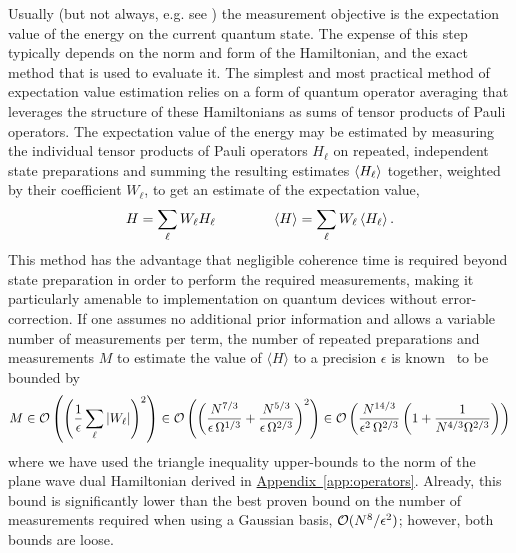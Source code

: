 \documentclass[superscriptaddress,aps,pra,nofootinbib,notitlepage,10pt,longbibliography]{revtex4-1}
\DeclareRobustCommand{\app}[1]{\hyperref[app:#1]{Appendix~\ref*{app:#1}}}
\def\avg#1{\mathinner{\langle{#1}\rangle}}
\begin{document}
Usually (but not always, e.g. see \cite{Santagati2016}) the measurement objective is the expectation value of the energy on the current quantum state. The expense of this step typically depends on the norm and form of the Hamiltonian, and the exact method that is used to evaluate it. The simplest and most practical method of expectation value estimation relies on a form of quantum operator averaging that leverages the structure of these Hamiltonians as sums of tensor products of Pauli operators. The expectation value of the energy may be estimated by measuring the individual tensor products of Pauli operators $H_\ell$ on repeated, independent state preparations and summing the resulting estimates $\avg{H_\ell}$ together, weighted by their coefficient $W_\ell$, to get an estimate of the expectation value,
\begin{equation}
\label{eq:var_ham}
H = \sum_{\ell} W_\ell H_\ell \quad \quad \quad \quad \avg{H} = \sum_{\ell} W_\ell \avg{H_\ell}.
\end{equation}
This method has the advantage that negligible coherence time is required beyond state preparation in order to perform the required measurements, making it particularly amenable to implementation on quantum devices without error-correction. If one assumes no additional prior information and allows a variable number of measurements per term, the number of repeated preparations and measurements $M$ to estimate the value of $\langle H \rangle$ to a precision $\epsilon$ is known~\cite{Wecker2015a,Rubin2018} to be bounded by
\begin{align}
M \in {\cal O} \left(\left(\frac{1}{\epsilon}\sum_{\ell} \left |W_\ell\right|\right)^2\right)
%
\in \mathcal{O}\left( \left(\frac{N^{7/3}}{\epsilon \, \Omega^{1/3}} + \frac{N^{5/3}}{\epsilon \, \Omega^{2/3}}\right)^2\right)
%
\in {\cal O}\left(\frac{N^{14/3}}{\epsilon^2 \, \Omega^{2/3}}\left( 1 + \frac{1}{N^{4/3}\Omega^{2/3}}\right)\right)
\end{align}
where we have used the triangle inequality upper-bounds to the norm of the plane wave dual Hamiltonian derived in \app{operators}. Already, this bound is significantly lower than the best proven bound on the number of measurements required when using a Gaussian basis, ${\cal O}(N^8 / \epsilon^2)$; however, both bounds are loose.
\end{document}
